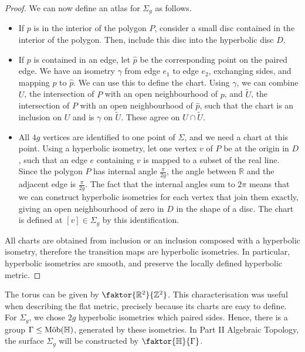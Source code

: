 \begin{proof}
	We can now define an atlas for \( \Sigma_g \) as follows.
	\begin{itemize}
		\item If \( p \) is in the interior of the polygon \( P \), consider a small disc contained in the interior of the polygon.
		      Then, include this disc into the hyperbolic disc \( D \).
		\item If \( p \) is contained in an edge, let \( \hat p \) be the corresponding point on the paired edge.
		      We have an isometry \( \gamma \) from edge \( e_1 \) to edge \( e_2 \), exchanging sides, and mapping \( p \) to \( \hat p \).
		      We can use this to define the chart.
		      Using \( \gamma \), we can combine \( U \), the intersection of \( P \) with an open neighbourhood of \( p \), and \( \widetilde U \), the intersection of \( P \) with an open neighbourhood of \( \hat p \), such that the chart is an inclusion on \( U \) and is \( \gamma \) on \( \widetilde U \).
		      These agree on \( U \cap \widetilde U \).
		\item All \( 4g \) vertices are identified to one point of \( \Sigma \), and we need a chart at this point.
		      Using a hyperbolic isometry, let one vertex \( v \) of \( P \) be at the origin in \( D \), such that an edge \( e \) containing \( v \) is mapped to a subset of the real line.
		      Since the polygon \( P \) has internal angle \( \frac{\pi}{2g} \), the angle between \( \mathbb R \) and the adjacent edge is \( \frac{\pi}{2g} \).
		      The fact that the internal angles sum to \( 2\pi \) means that we can construct hyperbolic isometries for each vertex that join them exactly, giving an open neighbourhood of zero in \( D \) in the shape of a disc.
		      The chart is defined at \( [v] \in \Sigma_g \) by this identification.
	\end{itemize}
	All charts are obtained from inclusion or an inclusion composed with a hyperbolic isometry, therefore the transition maps are hyperbolic isometries.
	In particular, hyperbolic isometries are smooth, and preserve the locally defined hyperbolic metric.
\end{proof}
\begin{remark}
	The torus can be given by \( \faktor{\mathbb R^2}{\mathbb Z^2} \).
	This characterisation was useful when describing the flat metric, precisely because its charts are easy to define.
	For \( \Sigma_g \), we chose \( 2g \) hyperbolic isometries which paired sides.
	Hence, there is a group \( \Gamma \leq \text{M\"ob}(\mathbb H) \), generated by these isometries.
	In Part II Algebraic Topology, the surface \( \Sigma_g \) will be constructed by \( \faktor{\mathbb H}{\Gamma} \).
\end{remark}

